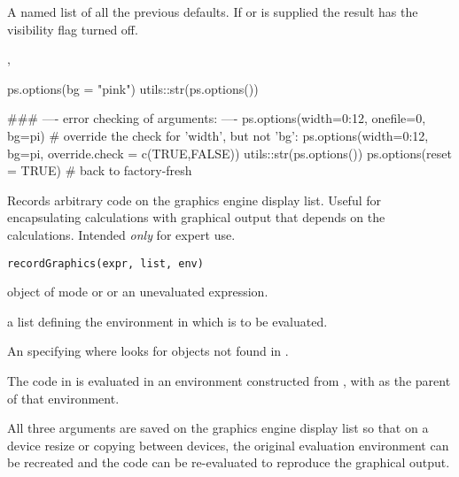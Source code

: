 %
\begin{Value}
A named list of all the previous defaults.  If  or
 is supplied the result has the visibility flag
turned off.
\end{Value}
%
\begin{SeeAlso}\relax
{}, 
\end{SeeAlso}
%
\begin{Examples}
\begin{ExampleCode}
ps.options(bg = "pink")
utils::str(ps.options())

### ---- error checking of arguments: ----
ps.options(width=0:12, onefile=0, bg=pi)
# override the check for 'width', but not 'bg':
ps.options(width=0:12, bg=pi, override.check = c(TRUE,FALSE))
utils::str(ps.options())
ps.options(reset = TRUE) # back to factory-fresh
\end{ExampleCode}
\end{Examples}
%
\begin{Description}\relax
Records arbitrary code on the graphics engine display list.
Useful for encapsulating calculations with graphical output
that depends on the calculations.
Intended \emph{only} for expert use.
\end{Description}
%
\begin{Usage}
\begin{verbatim}
recordGraphics(expr, list, env)
\end{verbatim}
\end{Usage}
%
\begin{Arguments}
\begin{ldescription}
\item[\code{expr}] object of mode  or  or
an unevaluated expression.
\item[\code{list}] a list defining the environment in which  is to
be evaluated.
\item[\code{env}] An  specifying
where \R{} looks for objects not found in
.
\end{ldescription}
\end{Arguments}
%
\begin{Details}\relax
The code in  is evaluated in an environment constructed
from , with  as the parent of that environment.

All three arguments are saved on the graphics engine display list
so that on a device resize or copying between devices, the original
evaluation environment can be recreated and the code can be
re-evaluated to reproduce the graphical output.
\end{Details}
